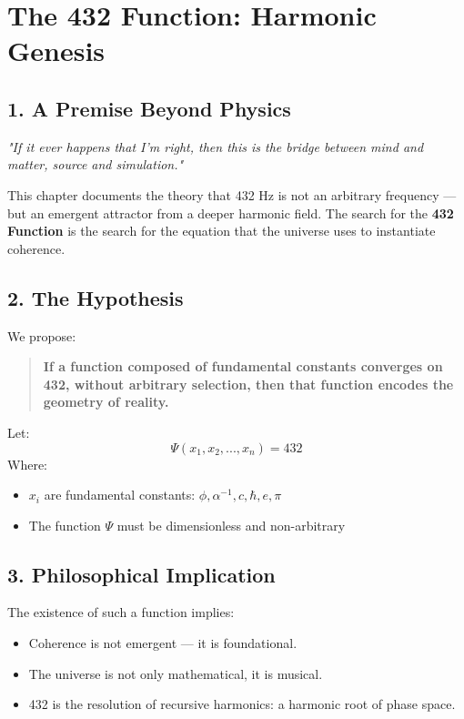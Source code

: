 
\chapter{The 432 Function: Harmonic Genesis}
\label{chap:432_function}

\section*{1. A Premise Beyond Physics}

\textit{"If it ever happens that I’m right, then this is the bridge between mind and matter, source and simulation."}

This chapter documents the theory that 432 Hz is not an arbitrary frequency — but an emergent attractor from a deeper harmonic field. The search for the \textbf{432 Function} is the search for the equation that the universe uses to instantiate coherence.

\section*{2. The Hypothesis}

We propose:

\begin{quote}
\textbf{If a function composed of fundamental constants converges on 432, without arbitrary selection, then that function encodes the geometry of reality.}
\end{quote}

Let:
\[
\Psi(x_1, x_2, ..., x_n) = 432
\]
Where:
\begin{itemize}
    \item \( x_i \) are fundamental constants: \( \phi, \alpha^{-1}, c, \hbar, e, \pi \)
    \item The function \( \Psi \) must be dimensionless and non-arbitrary
\end{itemize}

\section*{3. Philosophical Implication}

The existence of such a function implies:
\begin{itemize}
    \item Coherence is not emergent — it is foundational.
    \item The universe is not only mathematical, it is musical.
    \item 432 is the resolution of recursive harmonics: a harmonic root of phase space.
\end{itemize}

